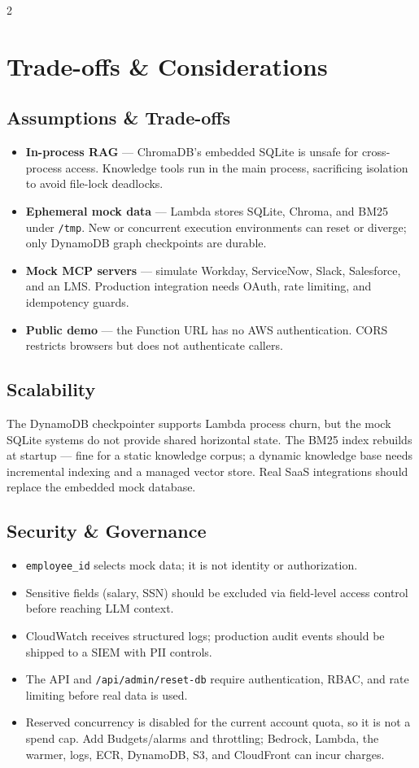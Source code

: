 \documentclass[10pt,a4paper]{article}
\begin{document}
\begin{multicols}{2}
\section{Trade-offs \& Considerations}

\subsection{Assumptions \& Trade-offs}
\begin{itemize}
  \item \textbf{In-process RAG} — ChromaDB's embedded SQLite is unsafe for cross-process access. Knowledge tools run in the main process, sacrificing isolation to avoid file-lock deadlocks.
  \item \textbf{Ephemeral mock data} — Lambda stores SQLite, Chroma, and BM25 under \texttt{/tmp}. New or concurrent execution environments can reset or diverge; only DynamoDB graph checkpoints are durable.
  \item \textbf{Mock MCP servers} — simulate Workday, ServiceNow, Slack, Salesforce, and an LMS. Production integration needs OAuth, rate limiting, and idempotency guards.
  \item \textbf{Public demo} — the Function URL has no AWS authentication. CORS restricts browsers but does not authenticate callers.
\end{itemize}

\subsection{Scalability}
The DynamoDB checkpointer supports Lambda process churn, but the mock SQLite systems do not provide shared horizontal state. The BM25 index rebuilds at startup — fine for a static knowledge corpus; a dynamic knowledge base needs incremental indexing and a managed vector store. Real SaaS integrations should replace the embedded mock database.

\subsection{Security \& Governance}
\begin{itemize}
  \item \texttt{employee\_id} selects mock data; it is not identity or authorization.
  \item Sensitive fields (salary, SSN) should be excluded via field-level access control before reaching LLM context.
  \item CloudWatch receives structured logs; production audit events should be shipped to a SIEM with PII controls.
  \item The API and \texttt{/api/admin/reset-db} require authentication, RBAC, and rate limiting before real data is used.
  \item Reserved concurrency is disabled for the current account quota, so it is not a spend cap. Add Budgets/alarms and throttling; Bedrock, Lambda, the warmer, logs, ECR, DynamoDB, S3, and CloudFront can incur charges.
\end{itemize}

\end{multicols}
\end{document}
